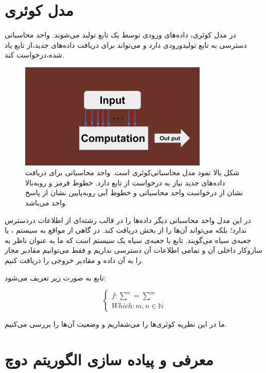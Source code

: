 \documentclass{book}
\begin{document}
\section{مدل کوئری}
در مدل کوئری، داده‌های ورودی توسط یک تابع تولید می‌شوند. واحد محاسباتی دسترسی به تابع تولیدورودی دارد و می‌تواند برای دریافت داده‌های جدید،‌از تابع یاد شده،‌درخواست کند.

\begin{figure}[ht]
	\centering
	\includegraphics[width=0.8\textwidth]{Query computation model.png}
	\caption{شکل بالا نمود مدل محاسباتی‌کوئری است. واحد محاسباتی برای دریافت داده‌های جدید نیاز به درخواست از تابع  دارد. خطوط قرمز و روبه‌بالا نشان از درخواست واحد محاسباتی و خطوط آبی روبه‌پایین نشان از پاسخ واحد می‌باشد.}
\end{figure}


در این مدل واحد محاسباتی دیگر داده‌ها را در قالب رشته‌ای از اطلاعات دردسترس ندارد؛ بلکه می‌تواند آن‌ها را از بخش  دریافت کند. در گاهی از مواقع به سیستم ،‌ یا جعبه‌ی سیاه می‌گویند. تابع  یا جعبه‌ی سیاه یک سیستم است که ما به عنوان ناظر به سازوکار داخلی آن و  تمامی اطلاعات آن دسترسی نداریم و فقط می‌توانیم مقادیر مجاز را به آن داده و مقادیر خروجی را دریافت کنیم. 

تابع  به صورت زیر تعریف می‌شود:
\begin{center}
$$
\left\{
\begin{array}{ll}
f : \sum^n = \sum^m\\
Which : m, n \in \mathbb{N}
\end{array}
\right.
$$
\end{center}

ما در این نظریه کوئری‌ها را می‌شماریم و وضعیت آن‌‌ها را بررسی می‌کنیم.

\section{معرفی و پیاده سازی الگوریتم دوچ}
\end{document}

